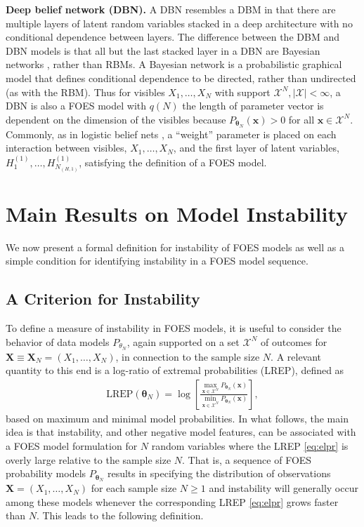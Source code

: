 \documentclass[numbib]{imamat}
\theoremstyle{theorem}
\theoremstyle{lemma}
\theoremstyle{example}
\theoremstyle{corollary}
\theoremstyle{definition}
\theoremstyle{remark}
\theoremstyle{approximation}
\theoremstyle{scheme}
\newcommand{\REP}{\mathrm{LREP}}
\begin{document}
\textbf{Deep belief network (DBN).} A DBN resembles a DBM in that there
are multiple layers of latent random variables stacked in a deep
architecture with no conditional dependence between layers. The
difference between the DBM and DBN models is that all but the last
stacked layer in a DBN are Bayesian networks
\citep[see][]{pearl985bayesian}, rather than RBMs. A Bayesian network is
a probabilistic graphical model that defines conditional dependence to
be directed, rather than undirected (as with the RBM). Thus for visibles
\(X_1, \dots, X_N\) with support
\(\mathcal{X}^N, \mid \mathcal{X} \mid < \infty\), a DBN is also a FOES
model with \(q(N)\) the length of parameter vector is dependent on the
dimension of the visibles because
\(P_{\boldsymbol \theta_N}(\boldsymbol x)>0\) for all
\(\boldsymbol x \in\mathcal{X}^N\). Commonly, as in logistic belief nets
\citep{neal1992connectionist}, a ``weight'' parameter is placed on each
interaction between visibles, \(X_1, \dots, X_N\), and the first layer
of latent variables, \(H^{(1)}_1, \dots, H^{(1)}_{N_{(H,1)}}\),
satisfying the definition of a FOES model.

\hypertarget{instability-results}{%
\section{Main Results on Model Instability}\label{instability-results}}

We now present a formal definition for instability of FOES models as
well as a simple condition for identifying instability in a FOES model
sequence.

\hypertarget{criterion}{%
\subsection{A Criterion for Instability}\label{criterion}}

To define a measure of instability in FOES models, it is useful to
consider the behavior of data models \(P_{\theta_N}\), again supported
on a set \(\mathcal{X}^N\) of outcomes for
\(\boldsymbol X\equiv \boldsymbol X_N =(X_1,\ldots,X_N)\), in connection
to the sample size \(N\). A relevant quantity to this end is a log-ratio
of extremal probabilities (LREP), defined as \begin{align}
\label{eq:elpr}
 \REP (\boldsymbol \theta_N)  =  \log \left[\frac{\max\limits_{  \boldsymbol x\in \mathcal{X}^N}P_{\boldsymbol \theta_N}( \boldsymbol x)}{\min\limits_{ \boldsymbol x \in \mathcal{X}^N}P_{\boldsymbol \theta_N}( \boldsymbol x)}\right],
\end{align} based on maximum and minimal model probabilities. In what
follows, the main idea is that instability, and other negative model
features, can be associated with a FOES model formulation for \(N\)
random variables where the LREP \eqref{eq:elpr} is overly large relative
to the sample size \(N\). That is, a sequence of FOES probability models
\(P_{\boldsymbol \theta_N}\) results in specifying the distribution of
observations \(\boldsymbol X=(X_1,\ldots,X_N)\) for each sample size
\(N \geq 1\) and instability will generally occur among these models
whenever the corresponding LREP \eqref{eq:elpr} grows faster than \(N\).
This leads to the following definition.
\end{document}
